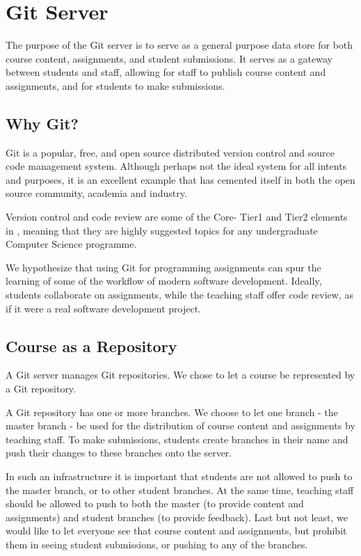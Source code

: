 
\section{Git Server}

The purpose of the Git server is to serve as a general purpose data store for
both course content, assignments, and student submissions. It serves as a
gateway between students and staff, allowing for staff to publish course
content and assignments, and for students to make submissions.

\subsection{Why Git?}

Git is a popular\cite{ohloh-2014}, free, and open source distributed version
control and source code management system\cite{git-2014}. Although perhaps not
the ideal system for all intents and purposes, it is an excellent example that
has cemented itself in both the open source community, academia and
industry\cite{gitprojects-2014}.

Version control and code review are some of the Core- Tier1 and Tier2 elements
in \cite{cs-curricula-2013}, meaning that they are highly suggested topics for
any undergraduate Computer Science programme.

We hypothesize that using Git for programming assignments can spur the learning
of some of the workflow of modern software development. Ideally, students
collaborate on assignments, while the teaching staff offer code review, as if
it were a real software development project.

\subsection{Course as a Repository}

A Git server manages Git repositories. We chose to let a course be represented
by a Git repository.

A Git repository has one or more branches. We choose to let one branch - the
master branch - be used for the distribution of course content and assignments
by teaching staff. To make submissions, students create branches in their name
and push their changes to these branches onto the server.

In such an infrastructure it is important that students are not allowed to push
to the master branch, or to other student branches. At the same time, teaching
staff should be allowed to push to both the master (to provide content and
assignments) and student branches (to provide feedback). Last but not least, we
would like to let everyone see that course content and assignments, but
prohibit them in seeing student submissions, or pushing to any of the branches.

